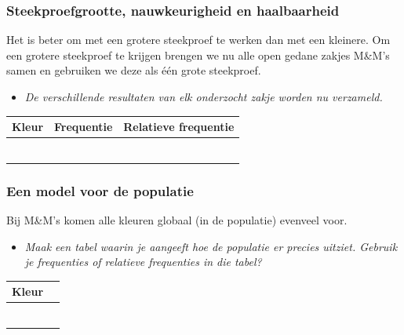 \documentclass[dutch]{beamer}
\newcommand{\vraag}[1]{\begin{itemize}\item[Vraag:] {\it #1}\end{itemize}}
\begin{document}
\begin{frame}
\frametitle{Steekproefgrootte, nauwkeurigheid en haalbaarheid}
Het is beter om met een grotere steekproef te werken dan met een kleinere. Om een grotere steekproef te krijgen brengen we nu alle open gedane zakjes M\&M's samen en gebruiken we deze als één grote steekproef.
\vraag{De verschillende resultaten van elk onderzocht zakje worden nu verzameld.}
\begin{center}
  \begin{tabular}{|p{2cm}|p{2cm}|p{2cm}|}
    \hline
    Kleur&Frequentie&Relatieve frequentie\\
    \hline
    &&\vspace*{0pt}\\
    \hline
    &&\vspace*{0pt}\\
    \hline
    &&\vspace*{0pt}\\
    \hline
    &&\vspace*{0pt}\\
    \hline
    &&\vspace*{0pt}\\
    \hline
    &&\vspace*{0pt}\\
    \hline
  \end{tabular}
\end{center}
\end{frame}

\begin{frame}
\frametitle{Een model voor de populatie}
Bij M\&M’s komen alle kleuren globaal (in de populatie) evenveel voor.

\vraag{Maak een tabel waarin je aangeeft hoe de populatie er precies uitziet. Gebruik je frequenties
of relatieve frequenties in die tabel?}
\begin{center}
  \begin{tabular}{|p{2cm}|p{2cm}|}
    \hline
    Kleur&\\
    \hline
    &\vspace*{0pt}\\
    \hline
    &\vspace*{0pt}\\
    \hline
    &\vspace*{0pt}\\
    \hline
    &\vspace*{0pt}\\
    \hline
    &\vspace*{0pt}\\
    \hline
    &\vspace*{0pt}\\
    \hline
  \end{tabular}
\end{center}
\end{frame}
\end{document}
